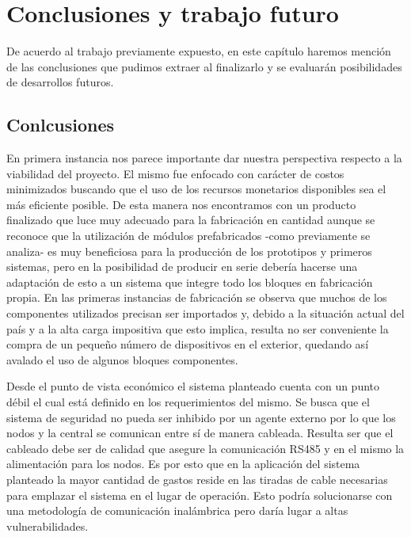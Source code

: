 \chapter{Conclusiones y trabajo futuro} \par

De acuerdo al trabajo previamente expuesto, en este capítulo haremos mención de las conclusiones que pudimos extraer al 
finalizarlo y se evaluarán posibilidades de desarrollos futuros.  \par

\section{Conlcusiones} \par 

En primera instancia nos parece importante dar nuestra perspectiva respecto a la viabilidad del proyecto. El mismo fue
enfocado con carácter de costos minimizados buscando que el uso de los recursos monetarios disponibles sea el más eficiente
posible. De esta manera nos encontramos con un producto finalizado que luce muy adecuado para la fabricación en cantidad aunque 
se reconoce que la utilización de módulos prefabricados -como previamente se analiza- es muy beneficiosa para la producción
de los prototipos y primeros sistemas, pero en la posibilidad de producir en serie debería hacerse una adaptación de esto a
un sistema que integre todo los bloques en fabricación propia. En las primeras instancias de fabricación se observa que
muchos de los componentes utilizados precisan ser importados y, debido a la situación actual del país y a la alta carga impositiva
que esto implica, resulta no ser conveniente la compra de un pequeño número de dispositivos en el exterior, quedando así 
avalado el uso de algunos bloques componentes. \par 
Desde el punto de vista económico el sistema planteado cuenta con un punto débil el cual está definido en los requerimientos del
mismo. Se busca que el sistema de seguridad no pueda ser inhibido por un agente externo por lo que los nodos y 
la central se comunican entre sí de manera cableada. Resulta ser que el cableado debe ser de calidad que asegure la comunicación
RS485 y en el mismo la alimentación para los nodos. Es por esto que en la aplicación del sistema planteado la mayor 
cantidad de gastos reside en las tiradas de cable necesarias para emplazar el sistema en el lugar de operación. Esto podría
solucionarse con una metodología de comunicación inalámbrica pero daría lugar a altas vulnerabilidades. \par
